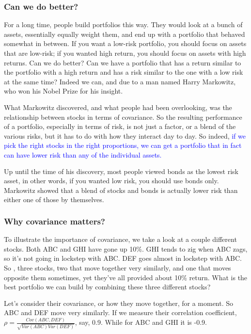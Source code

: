 \documentclass[12pt]{article}
\begin{document}
\subsubsection{Can we do better?}

For a long time, people build portfolios this way. They would look at a bunch of assets, essentially equally weight them, and end up with a portfolio that behaved somewhat in between. If you want a low-risk portfolio, you should focus on assets that are low-risk; if you wanted high return, you should focus on assets with high returns. Can we do better? Can we have a portfolio that has a return similar to the portfolio with a high return and has a risk similar to the one with a low risk at the same time? Indeed we can, and due to a man named Harry Markowitz, who won his Nobel Prize for his insight. 

What Markowitz discovered, and what people had been overlooking, was the relationship between stocks in terms of covariance. So the resulting performance of a portfolio, especially in terms of risk, is not just a factor, or a blend of the various risks, but it has to do with how they interact day to day. So indeed, \textcolor{blue}{if we pick the right stocks in the right proportions, we can get a portfolio that in fact can have lower risk than any of the individual assets.}

Up until the time of his discovery, most people viewed bonds as the lowest risk asset, in other words, if you wanted low risk, you should use bonds only. Markowitz showed that a blend of stocks and bonds is actually lower risk than either one of those by themselves. 

\subsubsection{Why covariance matters?}

To illustrate the importance of covariance, we take a look at a couple different stocks. Both ABC and GHI have gone up 10\%. GHI tends to zig when ABC zags, so it's not going in lockstep with ABC. DEF goes almost in lockstep with ABC. So , three stocks, two that move together very similarly, and one that moves opposite them sometimes, yet they've all provided about 10\% return. What is the best portfolio we can build by combining these three different stocks?

Let's consider their covariance, or how they move together, for a moment. So ABC and DEF move very similarly. If we measure their correlation coefficient, $\rho = \frac{Cov(ABC, DEF)}{\sqrt{Var(ABC)Var(DEF)}}$, say, 0.9. While for ABC and GHI it is -0.9. 
\end{document}
